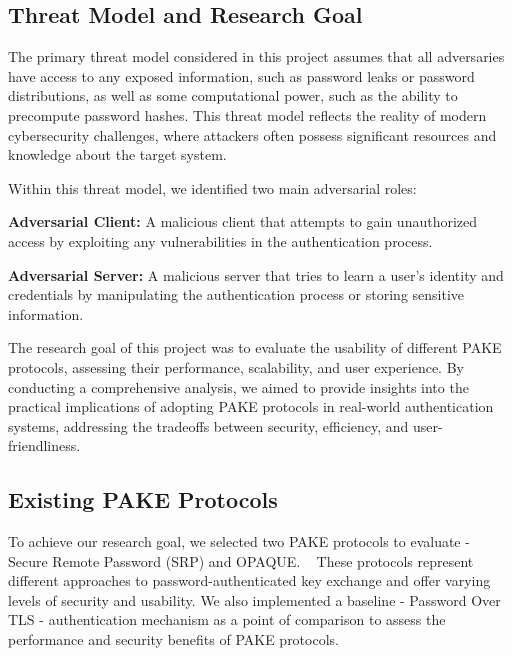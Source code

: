 \subsection{Threat Model and Research Goal}
\label{sec:threatmodel}

The primary threat model considered in this project assumes that all adversaries have access to any exposed information, such as password leaks or password distributions, as well as some computational power, such as the ability to precompute password hashes. This threat model reflects the reality of modern cybersecurity challenges, where attackers often possess significant resources and knowledge about the target system.

Within this threat model, we identified two main adversarial roles:

\begin{newitemize}
  \item \textbf{Adversarial Client:} A malicious client that attempts to gain unauthorized access by exploiting any vulnerabilities in the authentication process.
  \item \textbf{Adversarial Server:} A malicious server that tries to learn a user's identity and credentials by manipulating the authentication process or storing sensitive information.
\end{newitemize}

The research goal of this project was to evaluate the usability of different PAKE protocols, assessing their performance, scalability, and user experience. By conducting a comprehensive analysis, we aimed to provide insights into the practical implications of adopting PAKE protocols in real-world authentication systems, addressing the tradeoffs between security, efficiency, and user-friendliness.

\subsection{Existing PAKE Protocols}
\label{sec:existpake}

To achieve our research goal, we selected two PAKE protocols to evaluate - Secure Remote Password (SRP) and OPAQUE. ~\cite{jarecki2018opaque, wu1998srp} These protocols represent different approaches to password-authenticated key exchange and offer varying levels of security and usability. We also implemented a baseline - Password Over TLS - authentication mechanism as a point of comparison to assess the performance and security benefits of PAKE protocols.

